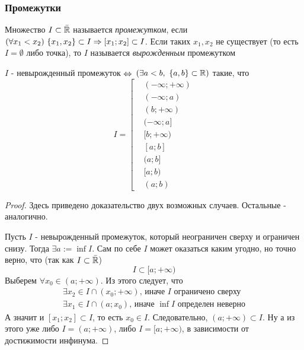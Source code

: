 \subsubsection*{Промежутки}

\begin{definition}
	Множество $I \subset \bar{\mathbb{R}}$ называется \textit{промежутком},
	если $(\forall x_1 < x_2)\ \{x_1, x_2\} \subset I \Rightarrow
	[x_1; x_2] \subset I$. Если таких $x_1, x_2$ не существует
	(то есть $I = \emptyset$ либо точка), то $I$ называется
	\textit{вырожденным} промежутком
\end{definition}

\begin{lemma}
	$I$ - невырожденный промежуток $\Leftrightarrow$
	$\left(\exists a < b,\ \{a, b\} \subset \mathbb{R}\right)$
	такие, что
	\[
		I = \left[
		\begin{aligned}
			&(-\infty; +\infty)
			\\
			&(-\infty; a)
			\\
			&(b; +\infty)
			\\
			&(-\infty; a]
			\\
			&[b; +\infty)
			\\
			&[a; b]
			\\
			&(a; b]
			\\
			&[a; b)
			\\
			&(a; b)
		\end{aligned}
		\right.
	\]
\end{lemma}

\begin{proof}
	Здесь приведено доказательство двух возможных случаев. Остальные - аналогично.
	
	Пусть $I$ - невырожденный промежуток, который неограничен сверху и ограничен снизу. Тогда $\exists a := \inf I$. Сам по себе $I$ может оказаться каким угодно, но точно верно, что (так как $I \subset \bar{\mathbb{R}}$)
	\[
		I \subset [a; +\infty)
	\]
	Выберем $\forall x_0 \in (a; +\infty)$. Из этого следует, что
	\begin{align*}
		\exists x_2 \in I \cap (x_0; +\infty) \text{, иначе } I \text{ ограничено сверху}
		\\
		\exists x_1 \in I \cap (a; x_0) \text{, иначе } \inf I \text{ определен неверно}
	\end{align*}
	А значит и $[x_1; x_2] \subset I$, то есть $x_0 \in I$. Следовательно,
	$(a;+\infty) \subset I$. Ну а из этого уже либо $I = (a; +\infty)$, либо $I = [a; +\infty)$, в зависимости от достижимости инфинума.
\end{proof}

